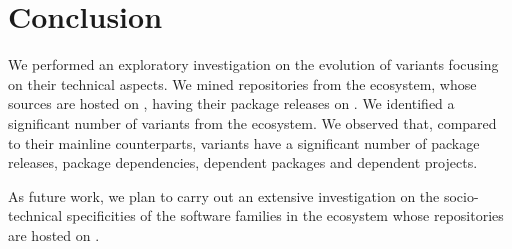 \section{Conclusion}
\label{sec:conclusion}
We performed an exploratory investigation on the evolution of variants focusing on their technical aspects. We mined repositories from the \js ecosystem, whose sources are hosted on \gh, having their package releases on \np.
We identified a significant number of variants from the \js ecosystem. We observed that, compared to their mainline counterparts, variants have a significant number of package releases, package dependencies, dependent packages and dependent projects.

As future work, we plan to carry out an extensive investigation on the socio-technical specificities of the software families in the \js ecosystem whose repositories are hosted on \gh. 

